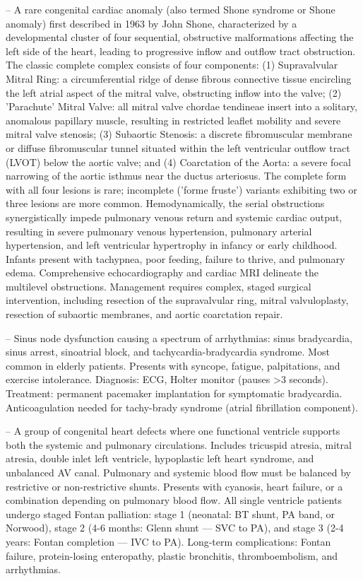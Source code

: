 -- A rare congenital cardiac anomaly (also termed Shone syndrome or Shone anomaly) first described in 1963 by John Shone, characterized by a developmental cluster of four sequential, obstructive malformations affecting the left side of the heart, leading to progressive inflow and outflow tract obstruction. The classic complete complex consists of four components: (1) Supravalvular Mitral Ring: a circumferential ridge of dense fibrous connective tissue encircling the left atrial aspect of the mitral valve, obstructing inflow into the valve; (2) 'Parachute' Mitral Valve: all mitral valve chordae tendineae insert into a solitary, anomalous papillary muscle, resulting in restricted leaflet mobility and severe mitral valve stenosis; (3) Subaortic Stenosis: a discrete fibromuscular membrane or diffuse fibromuscular tunnel situated within the left ventricular outflow tract (LVOT) below the aortic valve; and (4) Coarctation of the Aorta: a severe focal narrowing of the aortic isthmus near the ductus arteriosus. The complete form with all four lesions is rare; incomplete ('forme fruste') variants exhibiting two or three lesions are more common. Hemodynamically, the serial obstructions synergistically impede pulmonary venous return and systemic cardiac output, resulting in severe pulmonary venous hypertension, pulmonary arterial hypertension, and left ventricular hypertrophy in infancy or early childhood. Infants present with tachypnea, poor feeding, failure to thrive, and pulmonary edema. Comprehensive echocardiography and cardiac MRI delineate the multilevel obstructions. Management requires complex, staged surgical intervention, including resection of the supravalvular ring, mitral valvuloplasty, resection of subaortic membranes, and aortic coarctation repair.

-- Sinus node dysfunction causing a spectrum of arrhythmias: sinus bradycardia, sinus arrest, sinoatrial block, and tachycardia-bradycardia syndrome. Most common in elderly patients. Presents with syncope, fatigue, palpitations, and exercise intolerance. Diagnosis: ECG, Holter monitor (pauses >3 seconds). Treatment: permanent pacemaker implantation for symptomatic bradycardia. Anticoagulation needed for tachy-brady syndrome (atrial fibrillation component).

-- A group of congenital heart defects where one functional ventricle supports both the systemic and pulmonary circulations. Includes tricuspid atresia, mitral atresia, double inlet left ventricle, hypoplastic left heart syndrome, and unbalanced AV canal. Pulmonary and systemic blood flow must be balanced by restrictive or non-restrictive shunts. Presents with cyanosis, heart failure, or a combination depending on pulmonary blood flow. All single ventricle patients undergo staged Fontan palliation: stage 1 (neonatal: BT shunt, PA band, or Norwood), stage 2 (4-6 months: Glenn shunt — SVC to PA), and stage 3 (2-4 years: Fontan completion — IVC to PA). Long-term complications: Fontan failure, protein-losing enteropathy, plastic bronchitis, thromboembolism, and arrhythmias.

